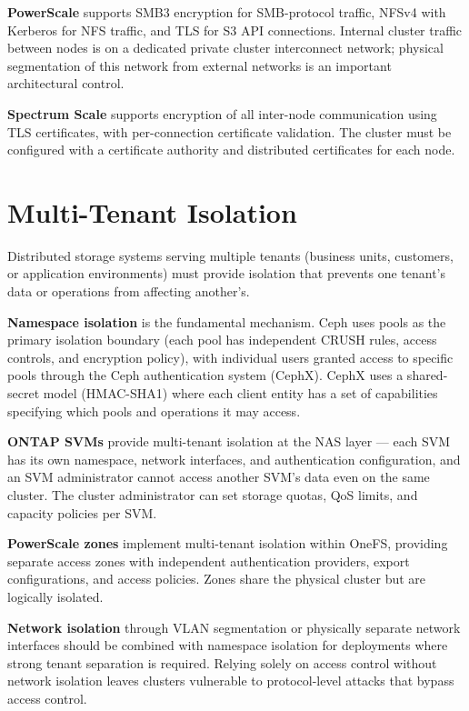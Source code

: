 \textbf{PowerScale} supports SMB3 encryption for SMB-protocol traffic, NFSv4 with Kerberos for NFS traffic, and TLS for S3 API connections. Internal cluster traffic between nodes is on a dedicated private cluster interconnect network; physical segmentation of this network from external networks is an important architectural control.

\textbf{Spectrum Scale} supports encryption of all inter-node communication using TLS certificates, with per-connection certificate validation. The cluster must be configured with a certificate authority and distributed certificates for each node.

\section{Multi-Tenant Isolation}
Distributed storage systems serving multiple tenants (business units, customers, or application environments) must provide isolation that prevents one tenant's data or operations from affecting another's.

\textbf{Namespace isolation} is the fundamental mechanism. Ceph uses pools as the primary isolation boundary (each pool has independent CRUSH rules, access controls, and encryption policy), with individual users granted access to specific pools through the Ceph authentication system (CephX). CephX uses a shared-secret model (HMAC-SHA1) where each client entity has a set of capabilities specifying which pools and operations it may access.

\textbf{ONTAP SVMs} provide multi-tenant isolation at the NAS layer --- each SVM has its own namespace, network interfaces, and authentication configuration, and an SVM administrator cannot access another SVM's data even on the same cluster. The cluster administrator can set storage quotas, QoS limits, and capacity policies per SVM.

\textbf{PowerScale zones} implement multi-tenant isolation within OneFS, providing separate access zones with independent authentication providers, export configurations, and access policies. Zones share the physical cluster but are logically isolated.

\textbf{Network isolation} through VLAN segmentation or physically separate network interfaces should be combined with namespace isolation for deployments where strong tenant separation is required. Relying solely on access control without network isolation leaves clusters vulnerable to protocol-level attacks that bypass access control.

